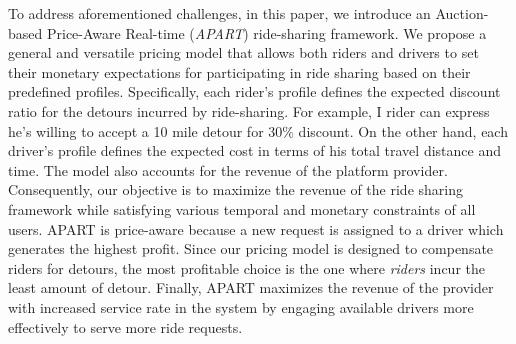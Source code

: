 To address aforementioned challenges, in this paper, we introduce an Auction-based Price-Aware Real-time (\textit{APART}) ride-sharing framework. We propose a general and versatile pricing model that allows both riders and drivers to set their monetary expectations for participating in ride sharing based on their predefined profiles. Specifically, each rider's profile defines the expected discount ratio for the detours incurred by ride-sharing. For example, I rider can express he's willing to accept a 10 mile detour for 30\% discount. On the other hand, each driver's profile defines the expected cost in terms of his total travel distance and time. The model also accounts for the revenue of the platform provider. Consequently, our objective is to maximize the revenue of the ride sharing framework while satisfying various temporal and monetary constraints of all users. APART is price-aware because a new request is assigned to a driver which generates the highest profit. Since our pricing model is designed to compensate riders for detours, the most profitable choice is the one where \textit{riders} incur the least amount of detour. Finally, APART maximizes the revenue of the provider with increased service rate in the system by engaging available drivers more effectively to serve more ride requests.




